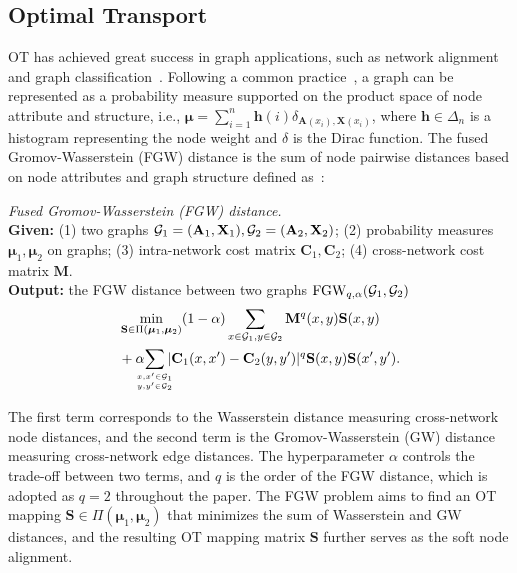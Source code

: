 \subsection{Optimal Transport}
OT has achieved great success in graph applications, such as network alignment~\cite{gwl,s-gwl,parrot,slotalign} and graph classification~\cite{qian2024reimagining,dong2020copt,zeng2023generative,zeng2024graph}.
Following a common practice~\cite{titouan2019optimal}, a graph can be represented as a probability measure supported on the product space of node attribute and structure, i.e., $\bm{\mu}=\sum_{i=1}^{n}\mathbf{h}(i)\delta_{\mathbf{A}(x_i),\mathbf{X}(x_i)}$, where $\mathbf{h}\in\Delta_{n}$ is a histogram representing the node weight and $\delta$ is the Dirac function. The fused Gromov-Wasserstein (FGW) distance is the sum of node pairwise distances based on node attributes and graph structure defined as~\cite{tam2019optimal}:
\begin{definition}\label{def:fgw} \textit{Fused Gromov-Wasserstein (FGW) distance.}\\
\textbf{Given:} (1) two graphs $\mathcal{G}_1=(\mathbf{A}_1,\mathbf{X}_1),\mathcal{G}_2=(\mathbf{A}_2,\mathbf{X}_2)$; (2) probability measures $\bm{\mu}_1,\bm{\mu}_2$ on graphs; (3) intra-network cost matrix $\mathbf{C}_1,\mathbf{C}_2$; (4) cross-network cost matrix $\mathbf{M}$.\\
\textbf{Output:} the FGW distance between two graphs $\textup{FGW}_{q,\alpha}(\mathcal{G}_1,\mathcal{G}_2)$
\vspace{-5pt}
\begin{equation}\label{eq:fgwd}
    \begin{aligned}
        &\min_{\mathbf{S}\in\Pi(\bm{\mu}_1,\bm{\mu}_2)}(1-\alpha)\sum_{x\in\G_1, y\in\G_2}\mathbf{M}^q(x,y)\mathbf{S}(x,y)\\
        &+ \alpha \!\!\!\!\!\sum_{x,x'\in\G_1\atop y,y'\in\G_2}\!\!\!\!|\mathbf{C}_1(x,x')-\mathbf{C}_2(y,y')|^q\mathbf{S}(x,y)\mathbf{S}(x',y').
    \end{aligned}
\end{equation}
\end{definition}
\vspace{-5pt}
The first term corresponds to the Wasserstein distance measuring cross-network node distances, and the second term is the Gromov-Wasserstein (GW) distance measuring cross-network edge distances. The hyperparameter $\alpha$ controls the trade-off between two terms, and $q$ is the order of the FGW distance, which is adopted as $q=2$ throughout the paper. The FGW problem aims to find an OT mapping $\mathbf{S}\in\Pi(\bm{\mu}_1, \bm{\mu}_2)$ that minimizes the sum of Wasserstein and GW distances, and the resulting OT mapping matrix $\mathbf{S}$ further serves as the soft node alignment.